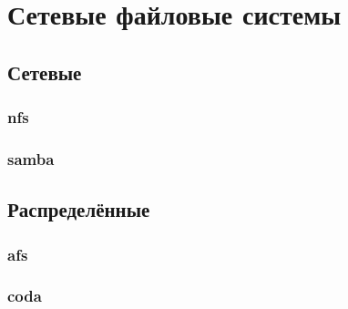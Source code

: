 \chapter{Сетевые файловые системы}
\section{Сетевые}
\subsection{nfs}
\subsection{samba}
\section{Распределённые}
\subsection{afs}
\subsection{coda}
